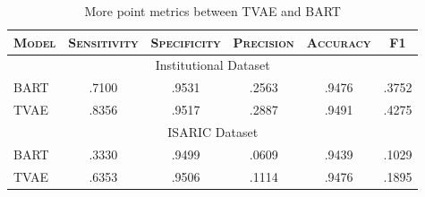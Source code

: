 
\begin{table}[tbh!]
  \caption{More point metrics between TVAE and BART}
  \label{TableS1}
  \centering
  \fontsize{7.5pt}{9pt}\selectfont
  \begin{tabular}{lccccc}
    \toprule
    \textsc{Model} & \textsc{Sensitivity}  &\textsc{Specificity}   & \textsc{Precision}  &\textsc{Accuracy} 
    &\textsc{F1} 
    \\
    \midrule
    \multicolumn{6}{c}{Institutional Dataset}\\
    \midrule 
    BART & .7100 & .9531  & .2563& .9476 &.3752   \\
    TVAE & .8356 & .9517& .2887 & .9491 &.4275   \\
    \midrule
    \multicolumn{6}{c}{ISARIC Dataset}\\
    \midrule
    BART & .3330 & .9499 & .0609 & .9439 & .1029 \\
    TVAE  & .6353 & .9506 &.1114  &.9476  &.1895 \\
    \bottomrule
  \end{tabular}
\end{table}